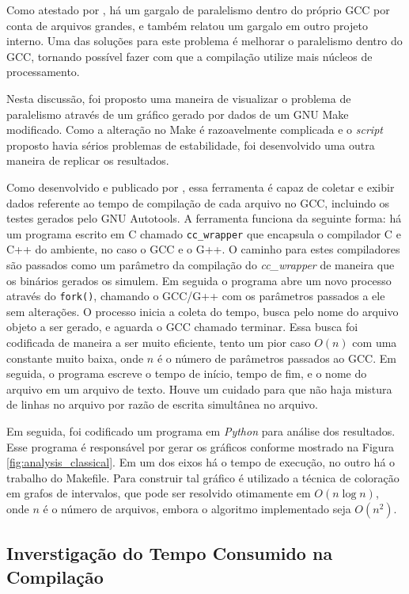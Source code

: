 Como atestado por \cite{PR84402}, há um gargalo de paralelismo dentro do
próprio GCC por conta de arquivos grandes, e \cite{mailgcc} também
relatou um gargalo em outro projeto interno. Uma das soluções para este
problema é melhorar o paralelismo dentro do GCC, tornando possível fazer
com que a compilação utilize mais núcleos de processamento.

Nesta discussão, foi proposto uma maneira de visualizar o problema de
paralelismo através de um gráfico gerado por dados de um GNU Make modificado.
Como a alteração no Make é razoavelmente complicada e o \textit{script} proposto
havia sérios problemas de estabilidade, foi desenvolvido uma outra maneira
de replicar os resultados.

Como desenvolvido e publicado por \cite{gcctimer}, essa
ferramenta é capaz de coletar e exibir dados referente ao tempo de compilação
de cada arquivo no GCC, incluindo os testes gerados pelo GNU Autotools.
A ferramenta funciona da seguinte forma: há um programa escrito em C chamado
\texttt{cc\_wrapper} que encapsula o compilador C e C++ do ambiente, no caso o 
GCC e o G++. O caminho para estes compiladores são passados como um parâmetro
da compilação do \textit{cc\_wrapper} de maneira que os binários gerados os
simulem. Em seguida o programa abre um novo processo através do \texttt{fork()},
chamando o GCC/G++ com os parâmetros passados a ele sem alterações. O processo
inicia a coleta do tempo, busca pelo nome do arquivo objeto a ser gerado, e
aguarda o GCC chamado terminar. Essa busca foi codificada de maneira a ser
muito eficiente, tento um pior caso $O(n)$ com uma constante muito baixa,
onde $n$ é o número de parâmetros passados ao GCC. Em seguida, o programa
escreve o tempo de início, tempo de fim, e o nome do arquivo em um arquivo
de texto. Houve um cuidado para que não haja mistura de linhas
no arquivo por razão de escrita simultânea no arquivo.

Em seguida, foi codificado um programa em \textit{Python} para análise dos
resultados. Esse programa é responsável por gerar os gráficos conforme
mostrado na Figura \ref{fig:analysis_classical}. Em um dos eixos há o
tempo de execução, no outro há
o trabalho do Makefile. Para construir tal gráfico é utilizado a técnica
de coloração em grafos de intervalos, que pode ser resolvido otimamente
em $O(n \log n)$, onde $n$ é o número de arquivos, embora o algoritmo
implementado seja $O(n^2)$.

\subsection{Inverstigação do Tempo Consumido na Compilação}

